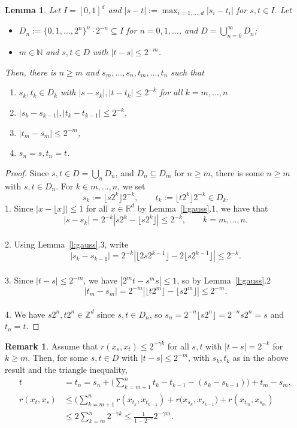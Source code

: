 \documentclass{article}
\newtheorem{lemma}[proposition]{Lemma}
\theoremstyle{definition}
\newtheorem{remark}[proposition]{Remark}
\theoremstyle{step} \newtheorem{step}{Step}
\begin{document}
\begin{lemma}
  Let $I = [0,1]^d$ and $|s-t| := \max_{i=1,...,d} |s_i - t_i|$ for
  $s,t\in I$. Let
  \begin{itemize}
  \item $D_n := \{0,1,...,2^n\}^n \cdot 2^{-n} \subseteq I$ for
    $n=0,1,...$, and $D =\bigcup_{n=0}^\infty D_n$;
  \item $m \in \mathbb N$ and $s,t \in D$ with $|t-s| \leq 2^{-m}$.
  \end{itemize}
  Then, there is $n \geq m$ and $s_m,...,s_n, t_m,...,t_n$ such that
  \begin{enumerate}
  \item $s_k, t_k \in D_k$ with $|s-s_k|, |t-t_k| \leq 2^{-k}$ for all
    $k=m,...,n$
  \item $|s_k - s_{k-1}|, |t_k - t_{k-1}| \leq 2^{-k}$,
  \item $|t_m - s_m| \leq 2^{-m}$,
  \item $s_n=s, t_n=t$.
  \end{enumerate}
\end{lemma}

\begin{proof}
  Since $s,t \in D = \bigcup_n D_n$, and $D_n \subseteq D_m$ for
  $n\geq m$, there is some $n \geq m$ with $s,t\in D_n$. For $k \in
  m,...,n$, we set
  $$s_k := \lfloor s2^k\rfloor 2^{-k}, \qquad t_k := \lfloor
  t2^k\rfloor 2^{-k} \in D_k.$$ 1.  Since $|x - \lfloor x \rfloor |
  \leq 1$ for all $x \in \mathbb R^d$ by Lemma~\ref{l:gauss}.1, we have that
  $$|s - s_k| = 2^{-k}|s2^k - \lfloor s2^k\rfloor| \leq 2^{-k}, \qquad
  k=m,...,n.$$ \\ 2. Using Lemma~\ref{l:gauss}.3, write
  $$ |s_k - s_{k-1}| = 2^{-k} | \lfloor 2s2^{k-1}\rfloor - 2\lfloor
  s2^{k-1}\rfloor| \leq 2^{-k}.$$ \\ 3. Since  $|t-s| \leq
  2^{-m}$, we have $|2^mt - s^ms| \leq 1$, so by Lemma~\ref{l:gauss}.2
  $$ |t_m - s_m| = 2^{-m} | \lfloor t2^m\rfloor - \lfloor s2^m
  \rfloor| \leq 2^{-m}.$$ \\ 4. We have $s2^n, t2^n \in \mathbb Z^d$
  since $s,t \in D_n$, so $s_n = 2^{-n} \lfloor s2^n\rfloor = 2^{-n} s
  2^n = s$ and $t_n = t$.
\end{proof}

\begin{remark}\label{rem1}
  Assume that $r(x_s, x_t) \leq 2^{-\gamma k}$ for all $s,t$ with
  $|t-s| = 2^{-k}$ for $k\geq m$. Then, for some $s,t\in D$ with
  $|t-s| \leq 2^{-m}$, with $s_k, t_k$ as in the above result and the
  triangle inequality,
  \begin{align*}
    t & = t_n = s_n + \Big(\sum_{k=m+1}^n t_k - t_{k-1} -(s_k -
    s_{k-1})\Big) + t_m - s_m,\\ r(x_t, x_s) & \leq
    \Big(\sum_{k=m+1}^n r(x_{t_k}, x_{t_{k-1}}) + r(x_{s_k},
    x_{s_{k-1}}\Big) + r(x_{t_m}, x_{s_m}) \\ & \leq 2 \sum_{k=m}^n
    2^{-\gamma k} \leq \tfrac{1}{1-2^{-\gamma}} 2^{-\gamma m}.
  \end{align*}
\end{remark}
\end{document}
